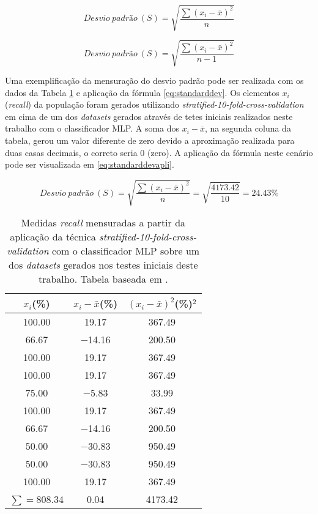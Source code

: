 \begin{equation} 
  Desvio~padrão~(S) = \sqrt{\frac{\sum{(x_{i}-\bar{x})^2}}{n}} 
  \label{eq:standarddev}
\end{equation}

\begin{equation} 
  Desvio~padrão~(S) = \sqrt{\frac{\sum{(x_{i}-\bar{x})^2}}{n-1}} 
  \label{eq:standarddevsub}
\end{equation}

Uma exemplificação da mensuração do desvio padrão pode ser realizada com os dados da Tabela \ref{table:datakcrossvalidation} e aplicação da fórmula \ref{eq:standarddev}. Os elementos \textit{$x_{i}$} (\textit{recall}) da população foram gerados utilizando \textit{stratified-10-fold-cross-validation} em cima de um dos \textit{datasets} gerados através de tetes iniciais realizados neste trabalho com o classificador MLP. A soma dos \textit{$x_{i}-\bar{x}$}, na segunda coluna da tabela, gerou um valor diferente de zero devido a aproximação realizada para duas casas decimais, o correto seria 0 (zero). A aplicação da fórmula neste cenário pode ser visualizada em \ref{eq:standarddevapli}.

\begin{equation} 
  Desvio~padrão~(S) = \sqrt{\frac{\sum{(x_{i}-\bar{x})^2}}{n}}=\sqrt{\frac{4173.42}{10}}=24.43\%
  \label{eq:standarddevapli}
\end{equation}

\begin{table}[!htp]
  \centering
  \begin{tabular}{|c c c|}
    \hline
       {\bf $x_{i}$(\%)} & {\bf $x_{i}-\bar{x}$(\%)} & {\bf $(x_{i}-\bar{x})^2$(\%)$^2$} \\
    \hline
       100.00 & 19.17 & 367.49\\
    \hline
       66.67 & −14.16 &  200.50\\
     \hline
       100.00 & 19.17 & 367.49\\
    \hline
       100.00 & 19.17 & 367.49\\
     \hline
       75.00 & −5.83 & 33.99\\
    \hline
       100.00 & 19.17 & 367.49\\
     \hline
       66.67 & −14.16 & 200.50\\
    \hline
       50.00 & −30.83 & 950.49\\
     \hline
       50.00 & −30.83 &  950.49\\
    \hline
       100.00 & 19.17 & 367.49\\
    \hline\hline
       $\sum=$808.34 & 0.04 &  4173.42\\
    \hline
  \end{tabular}
  \caption{Medidas \textit{recall} mensuradas a partir da aplicação da técnica \textit{stratified-10-fold-cross-validation} com o classificador MLP sobre um dos \textit{datasets} gerados nos testes iniciais deste trabalho. Tabela baseada em \cite{Kerr:2002}.}
  \label{table:datakcrossvalidation}
\end{table}
                    
